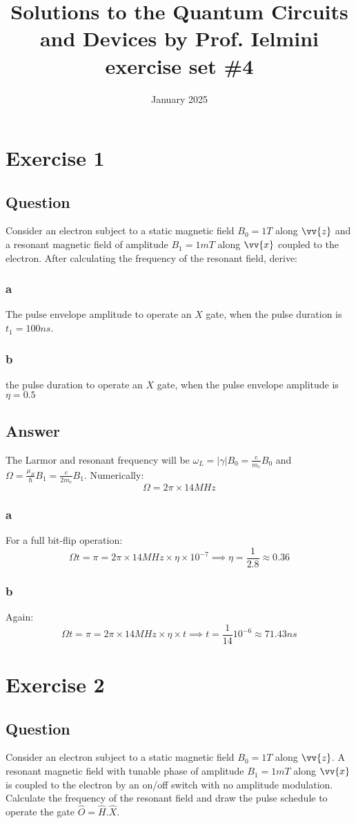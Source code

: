 \documentclass{article}
\title{Solutions to the Quantum Circuits and Devices by Prof. Ielmini exercise set \#4}
\author{}
\date{January 2025}
\begin{document}
\maketitle

\section{Exercise 1}
\subsection{Question}
Consider an electron subject to a static magnetic field $B_0 = 1 T$ along $\vv{z}$ and a resonant magnetic field of amplitude $B_1 = 1 mT$ along $\vv{x}$ coupled to the electron. After calculating the frequency of the resonant field, derive:  
\subsubsection{a}
The pulse envelope amplitude to operate an $X$ gate, when the pulse duration is $t_1 = 100 ns$.
\subsubsection{b}
the pulse duration to operate an $X$ gate, when the pulse envelope amplitude is $\eta  = 0.5$
\subsection{Answer}
The Larmor and resonant frequency will be $\omega_L = |\gamma|B_0 = \frac{e}{m_e}B_0$ and $\Omega = \frac{\mu_B}{\hbar}B_1 = \frac{e}{2m_e}B_1$. Numerically:
$$\Omega = 2\pi \times 14MHz$$
\subsubsection{a}
For a full bit-flip operation:
$$\Omega t = \pi = 2\pi \times 14 MHz \times \eta \times 10^{-7} \implies \eta = \frac{1}{2.8} \approx 0.36$$
\subsubsection{b}
Again:
$$\Omega t = \pi = 2\pi \times 14MHz \times \eta \times t \implies t = \frac{1}{14} 10^{-6} \approx 71.43 ns$$

\section{Exercise 2}
\subsection{Question}
Consider an electron subject to a static magnetic field $B_0 = 1T$ along $\vv{z}$. A resonant magnetic field with tunable phase of amplitude $B_1 = 1mT $ along $\vv{x}$ is coupled to the electron by an on/off switch with no amplitude modulation. Calculate the frequency of the resonant field and draw the pulse schedule to operate the gate $\hat{O} = \hat{H}.\hat{X}$.  
\end{document}
